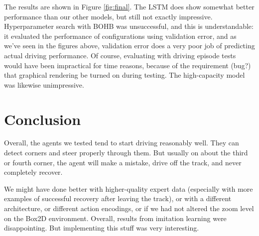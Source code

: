 \documentclass[11pt]{article} %
\begin{document}
The results are shown in Figure \ref{fig:final}. The LSTM does show somewhat better performance than our other models, but still not exactly impressive. Hyperparameter search with BOHB was unsuccessful, and this is understandable: it evaluated the performance of configurations using validation error, and as we've seen in the figures above, validation error does a very poor job of predicting actual driving performance. Of course, evaluating with driving episode tests would have been impractical for time reasons, because of the requirement (bug?) that graphical rendering be turned on during testing. The high-capacity model was likewise unimpressive.

\section{Conclusion}

Overall, the agents we tested tend to start driving reasonably well. They can detect corners and steer properly through them. But usually on about the third or fourth corner, the agent will make a mistake, drive off the track, and never completely recover.

We might have done better with higher-quality expert data (especially with more examples of successful recovery after leaving the track), or with a different architecture, or different action encodings, or if we had not altered the zoom level on the Box2D environment. Overall, results from imitation learning were disappointing. But implementing this stuff was very interesting.
\end{document}
